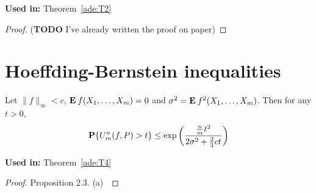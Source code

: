 \textbf{Used in:} Theorem~\ref{ade:T2}

\begin{proof}
  (\textbf{TODO} I've already written the proof on paper)
\end{proof}

\section{Hoeffding-Bernstein inequalities}

\begin{theorem}\label{hb:T1}
  Let $\|f\|_\infty < c$, $\E f(X_1,\ldots, X_m) = 0$ and $\sigma^2 = \E f^2(X_1,\ldots, X_m)$. Then for any $t > 0$,
  \begin{equation}
    \P\{U_m^n(f,P) > t\} \leq \exp \left(\dfrac{\tfrac{n}{m}t^2}{2\sigma^2 + \tfrac{2}{3}ct}\right)
  \end{equation}
\end{theorem}

\textbf{Used in:} Theorem~\ref*{ade:T4}

\begin{proof}
  Proposition 2.3. (a)~\cite{arcones1993limit}
\end{proof}